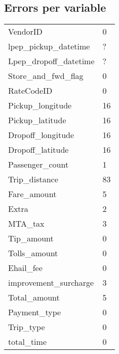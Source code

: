 \documentclass{article}
\begin{document}
\subsection{Errors per variable}
\begin{table}[H]
\centering
\begin{tabular}{ll}
VendorID  &  0 \\
lpep\_pickup\_datetime & ?\\
Lpep\_dropoff\_datetime& ?\\
Store\_and\_fwd\_flag    & 0 \\
RateCodeID          & 0 \\
Pickup\_longitude    &  16\\
Pickup\_latitude     &  16\\
Dropoff\_longitude   &  16\\
Dropoff\_latitude     & 16\\
Passenger\_count       & 1\\
Trip\_distance        &83\\
Fare\_amount & 5\\
Extra       & 2 \\
MTA\_tax      &  3\\
Tip\_amount    &   0\\
Tolls\_amount   &    0\\
Ehail\_fee       &     0\\
improvement\_surcharge & 3\\
Total\_amount         & 5\\
Payment\_type          & 0\\
Trip\_type            & 0\\
total\_time            & 0
\end{tabular}
\end{table}
\end{document}

